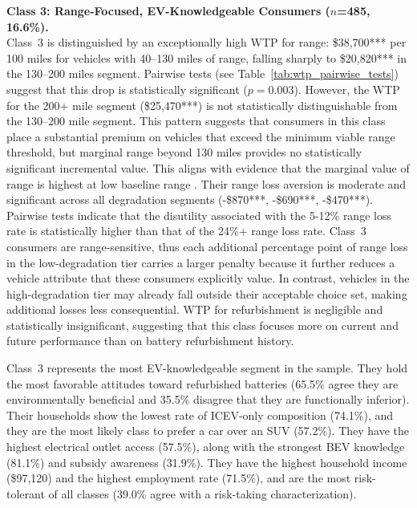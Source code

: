 \documentclass[a4paper,fleqn]{cas-sc}   %
\begin{document}
\noindent\textbf{Class 3: Range-Focused, EV-Knowledgeable Consumers ($n$=485, 16.6\%).}\\
Class~3 is distinguished by an exceptionally high WTP for range: \$38,700*** per 100 miles for vehicles with 40--130 miles of range, falling sharply to \$20,820*** in the 130--200 miles segment. Pairwise tests (see Table~\ref{tab:wtp_pairwise_tests}) suggest that this drop is statistically significant ($p = 0.003$). However, the WTP for the 200+ mile segment (\$25,470***) is not statistically distinguishable from the 130--200 mile segment. This pattern suggests that consumers in this class place a substantial premium on vehicles that exceed the minimum viable range threshold, but marginal range beyond 130 miles provides no statistically significant incremental value. This aligns with evidence that the marginal value of range is highest at low baseline range \parencite{dimitropoulosConsumerValuationChanges2013, hackbarthWillingnesstopayAlternativeFuel2016}. Their range loss aversion is moderate and significant across all degradation segments (-\$870***, -\$690***, -\$470***). Pairwise tests indicate that the disutility associated with the 5-12\% range loss rate is statistically higher than that of the 24\%+ range loss rate. Class~3 consumers are range-sensitive, thus each additional percentage point of range loss in the low-degradation tier carries a larger penalty because it further reduces a vehicle attribute that these consumers explicitly value. In contrast, vehicles in the high-degradation tier may already fall outside their acceptable choice set, making additional losses less consequential. WTP for refurbishment is negligible and statistically insignificant, suggesting that this class focuses more on current and future performance than on battery refurbishment history.

Class~3 represents the most EV-knowledgeable segment in the sample. They hold the most favorable attitudes toward refurbished batteries (65.5\% agree they are environmentally beneficial and 35.5\% disagree that they are functionally inferior). Their households show the lowest rate of ICEV-only composition (74.1\%), and they are the most likely class to prefer a car over an SUV (57.2\%). They have the highest electrical outlet access (57.5\%), along with the strongest BEV knowledge (81.1\%) and subsidy awareness (31.9\%). They have the highest household income (\$97,120) and the highest employment rate (71.5\%), and are the most risk-tolerant of all classes (39.0\% agree with a risk-taking characterization).
\end{document}
